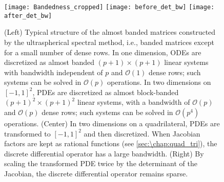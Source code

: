 \begin{figure}
  \centering
  \texttt{[image: Bandedness\_cropped]}%
  \hspace{0.16cm}
  \texttt{[image: before\_det\_bw]}%
  \hspace{0.25cm}
  \texttt{[image: after\_det\_bw]}%
\caption{(Left) Typical structure of the almost banded matrices constructed by the ultraspherical spectral method, i.e., banded matrices except for a small number of dense rows. In one dimension, ODEs are discretized as almost banded $(p+1) \times (p+1)$ linear systems with bandwidth independent of $p$ and $\mathcal{O}(1)$ dense rows; such systems can be solved in $\mathcal{O}(p)$ operations. In two dimensions on $[-1,1]^2$, PDEs are discretized as almost block-banded $(p+1)^2 \times (p+1)^2$ linear systems, with a bandwidth of $\mathcal{O}(p)$ and $\mathcal{O}(p)$ dense rows; such systems can be solved in $\mathcal{O}(p^4)$ operations.
(Center) In two dimensions on a quadrilateral, PDEs are transformed to $[-1,1]^2$ and then discretized. When Jacobian factors are kept as rational functions (see \cref{sec:\chap:quad_tri}), the discrete differential operator has a large bandwidth. (Right) By scaling the transformed PDE twice by the determinant of the Jacobian, the discrete differential operator remains sparse.}
\label{fig:\chap:bandedness}
\end{figure}


